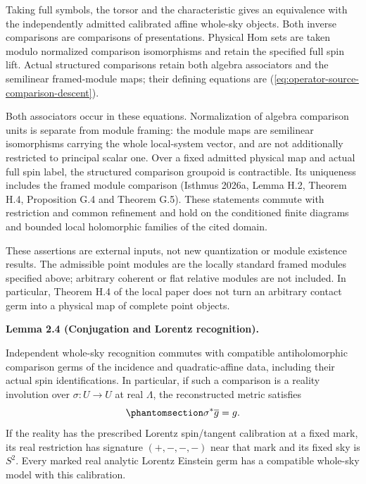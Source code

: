 \documentclass[
  english,
  11pt,
  reqno]{amsart}
\makeatletter
\newcommand{\pandocstatementheading}[1]{%
  \par\addpenalty{\@beginparpenalty}%
  \addvspace{.5\baselineskip plus .2\baselineskip minus .2\baselineskip}%
  {\normalfont\bfseries #1\par}%
  \nobreak\@afterindenttrue\@afterheading
}
\makeatother
\begin{document}
Taking full symbols, the torsor and the characteristic gives an
equivalence with the independently admitted calibrated affine whole-sky
objects. Both inverse comparisons are comparisons of presentations.
Physical Hom sets are taken modulo normalized comparison isomorphisms
and retain the specified full spin lift. Actual structured comparisons
retain both algebra associators and the semilinear framed-module maps;
their defining equations are
(\ref{eq:operator-source-comparison-descent}).

Both associators occur in these equations. Normalization of algebra
comparison units is separate from module framing: the module maps are
semilinear isomorphisms carrying the whole local-system vector, and are
not additionally restricted to principal scalar one. Over a fixed
admitted physical map and actual full spin label, the structured
comparison groupoid is contractible. Its uniqueness includes the framed
module comparison (Isthmus 2026a, Lemma H.2, Theorem H.4, Proposition
G.4 and Theorem G.5). These statements commute with restriction and
common refinement and hold on the conditioned finite diagrams and
bounded local holomorphic families of the cited domain.

These assertions are external inputs, not new quantization or module
existence results. The admissible point modules are the locally standard
framed modules specified above; arbitrary coherent or flat relative
modules are not included. In particular, Theorem H.4 of the local paper
does not turn an arbitrary contact germ into a physical map of complete
point objects.

\pandocstatementheading{\protect{}\label{lem:independent-ray-lorentz-recognition-v092}Lemma 2.4 (Conjugation and Lorentz recognition).}

Independent whole-sky recognition commutes with compatible
antiholomorphic comparison germs of the incidence and quadratic-affine
data, including their actual spin identifications. In particular, if
such a comparison is a reality involution over \(\sigma:U\to U\) at real
\(\Lambda\), the reconstructed metric satisfies
\begin{equation}\protect\phantomsection\label{eq:independent-ray-metric-reality-v092}{
\sigma^*\overline g=g.
}\end{equation} If the reality has the prescribed Lorentz spin/tangent
calibration at a fixed mark, its real restriction has signature
\((+,-,-,-)\) near that mark and its fixed sky is \(S^2\). Every marked
real analytic Lorentz Einstein germ has a compatible whole-sky model
with this calibration.
\end{document}

